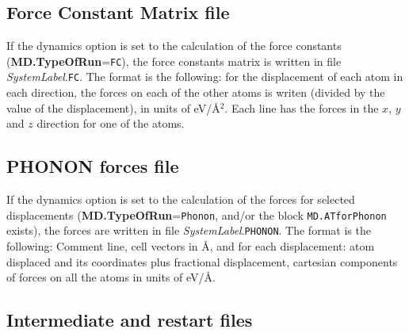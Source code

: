 \documentclass[11pt]{article}
\begin{document}
\subsection{Force Constant Matrix file}

If the dynamics option is set to the calculation 
of the force constants ({\bf MD.TypeOfRun}={\tt FC}),
the force constants matrix is written in file {\it SystemLabel}.{\tt FC}.
The format is the following: for the displacement of
each atom in each direction, the forces on each of the other
atoms is writen (divided by the value of the displacement),
in units of eV/\AA$^2$. Each line has the forces in the $x$, $y$
and $z$ direction for one of the atoms.

\subsection{PHONON forces file}

If the dynamics option is set to the calculation of the forces for
selected displacements ({\bf MD.TypeOfRun}={\tt Phonon}, and/or the
block {\tt MD.ATforPhonon} exists), the forces
are written in file {\it SystemLabel}.{\tt PHONON}.  The format is the
following: Comment line, cell vectors in {\AA}, and for each
displacement: atom displaced and its coordinates plus fractional
displacement, cartesian components of forces on all the atoms in units
of eV/\AA. 


\subsection{Intermediate and restart files}
\end{document}
